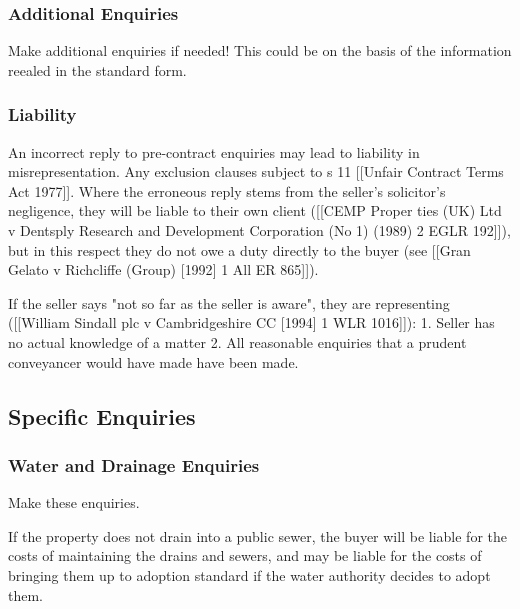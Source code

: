 \documentclass[
]{article}
\newenvironment{Shaded}{}{}
\newcommand{\NormalTok}[1]{#1}
\begin{document}
\hypertarget{additional-enquiries}{%
\subsubsection{Additional Enquiries}\label{additional-enquiries}}

Make additional enquiries if needed! This could be on the basis of the
information reealed in the standard form.

\hypertarget{liability-2}{%
\subsubsection{Liability}\label{liability-2}}

An incorrect reply to pre-contract enquiries may lead to liability in
misrepresentation. Any exclusion clauses subject to s 11 {[}{[}Unfair
Contract Terms Act 1977{]}{]}. Where the erroneous reply stems from the
seller's solicitor's negligence, they will be liable to their own client
({[}{[}CEMP Proper ties (UK) Ltd v Dentsply Research and Development
Corporation (No 1) (1989) 2 EGLR 192{]}{]}), but in this respect they do
not owe a duty directly to the buyer (see {[}{[}Gran Gelato v Richcliffe
(Group) {[}1992{]} 1 All ER 865{]}{]}).

\begin{Shaded}
\begin{Highlighting}[]
\NormalTok{If the seller says "not so far as the seller is aware", they are representing ([[William Sindall plc v Cambridgeshire CC [1994] 1 WLR 1016]]):}
\NormalTok{1. Seller has no actual knowledge of a matter}
\NormalTok{2. All reasonable enquiries that a prudent conveyancer would have made have been made. }
\end{Highlighting}
\end{Shaded}

\hypertarget{specific-enquiries}{%
\subsection{Specific Enquiries}\label{specific-enquiries}}

\hypertarget{water-and-drainage-enquiries}{%
\subsubsection{Water and Drainage
Enquiries}\label{water-and-drainage-enquiries}}

Make these enquiries.

If the property does not drain into a public sewer, the buyer will be
liable for the costs of maintaining the drains and sewers, and may be
liable for the costs of bringing them up to adoption standard if the
water authority decides to adopt them.
\end{document}
